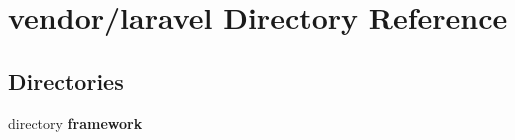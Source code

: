 \section{vendor/laravel Directory Reference}
\label{dir_fa7c9eef9e58a67e40c1c67570dbd35b}
\subsection*{Directories}
\begin{DoxyCompactItemize}
\item 
directory {\bf framework}
\end{DoxyCompactItemize}
